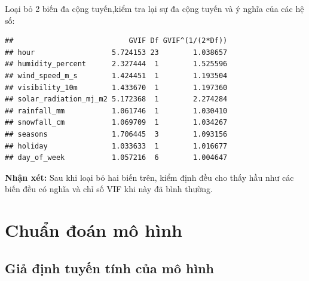 \documentclass[
  11pt,
  letterpaper,
]{article}
\begin{document}
Loại bỏ 2 biến đa cộng tuyến,kiểm tra lại sự đa cộng tuyến và ý nghĩa của các hệ số:

\begin{verbatim}
##                           GVIF Df GVIF^(1/(2*Df))
## hour                  5.724153 23        1.038657
## humidity_percent      2.327444  1        1.525596
## wind_speed_m_s        1.424451  1        1.193504
## visibility_10m        1.433670  1        1.197360
## solar_radiation_mj_m2 5.172368  1        2.274284
## rainfall_mm           1.061746  1        1.030410
## snowfall_cm           1.069709  1        1.034267
## seasons               1.706445  3        1.093156
## holiday               1.033633  1        1.016677
## day_of_week           1.057216  6        1.004647
\end{verbatim}

\textbf{Nhận xét:} Sau khi loại bỏ hai biến trên, kiểm định đều cho thấy hầu như các biến đều có nghĩa và chỉ số VIF khi này đã bình thường.

\section{Chuẩn đoán mô hình}

\subsection{Giả định tuyến tính của mô hình}
\end{document}
